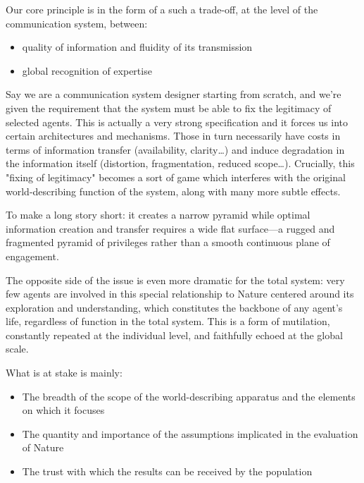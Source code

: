 \documentclass[11pt]{article}
\begin{document}
Our core principle is in the form of a such a trade-off, at the level of the
communication system, between:

\begin{itemize}

\item quality of information and fluidity of its transmission

\item global recognition of expertise

\end{itemize}

Say we are a communication system designer starting from scratch, and we're given the
requirement that the system must be able to fix the legitimacy of selected agents. This
is actually a very strong specification and it forces us into certain architectures and
mechanisms. Those in turn necessarily have costs in terms of information transfer
(availability, clarity\ldots{}) and induce degradation in the information itself
(distortion, fragmentation, reduced scope\ldots{}). Crucially, this "fixing of
legitimacy" becomes a sort of game which interferes with the original world-describing
function of the system, along with many more subtle effects.

To make a long story short: it creates a narrow pyramid while optimal information
creation and transfer requires a wide flat surface---a rugged and fragmented pyramid of
privileges rather than a smooth continuous plane of engagement.

The opposite side of the issue is even more dramatic for the total system: very few
agents are involved in this special relationship to Nature centered around its
exploration and understanding, which constitutes the backbone of any agent's life,
regardless of function in the total system. This is a form of mutilation, constantly
repeated at the individual level, and faithfully echoed at the global scale.

What is at stake is mainly:

\begin{itemize}

\item The breadth of the scope of the world-describing apparatus and the elements on which it
focuses

\item The quantity and importance of the assumptions implicated in the evaluation of Nature

\item The trust with which the results can be received by the population

\end{itemize}
\end{document}
